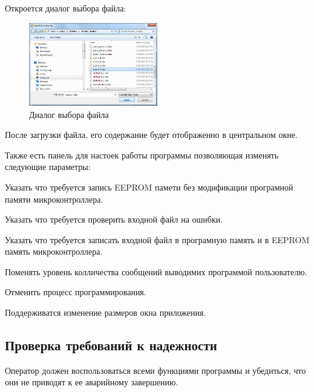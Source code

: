 Откроется диалог выбора файла:
\begin{figure}[h!]
    \centering
    \includegraphics[width=0.5\textwidth]{../screenshots/open_file_dialog.png}
    \caption{Диалог выбора файла}
\end{figure}

После загрузки файла, его содержание будет отображенно в центральном окне.


Также есть панель для настоек работы программы позволяющая изменять следующие параметры:
\begin{my_enumerate}
\item Указать что требуется запись EEPROM памети без модификации програмной памяти микроконтроллера.
\item Указать что требуется проверить входной файл на ошибки.
\item Указать что требуется записать входной файл в програмную память и в EEPROM память микроконтроллера.
\item Поменять уровень колличества сообщений выводимих программой пользователю.
\item Отменить процесс программирования.
\end{my_enumerate}


Поддерживатся изменение размеров окна приложения.


\subsection{Проверка требований к надежности}
Оператор должен воспользоваться всеми функциями программы и убедиться, что они не приводят к ее аварийному завершению.
